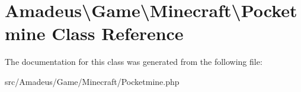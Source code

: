 \hypertarget{classAmadeus_1_1Game_1_1Minecraft_1_1Pocketmine}{}\section{Amadeus\textbackslash{}Game\textbackslash{}Minecraft\textbackslash{}Pocketmine Class Reference}
\label{classAmadeus_1_1Game_1_1Minecraft_1_1Pocketmine}


The documentation for this class was generated from the following file\+:\begin{DoxyCompactItemize}
\item 
src/\+Amadeus/\+Game/\+Minecraft/Pocketmine.\+php\end{DoxyCompactItemize}
